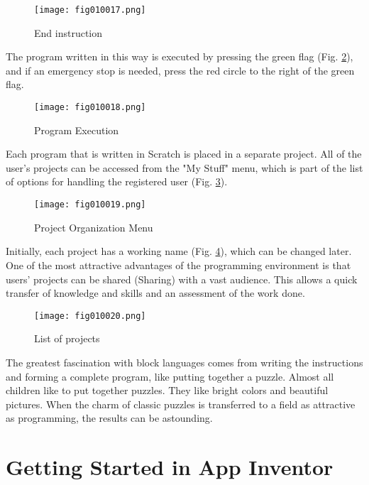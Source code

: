 \begin{figure}[H]
   \centering
   \texttt{[image: fig010017.png]}
   \caption{End instruction}
\label{fig010017}
\end{figure}

The program written in this way is executed by pressing the green flag (Fig. \ref{fig010018}), and if an emergency stop is needed, press the red circle to the right of the green flag.

\begin{figure}[H]
   \centering
   \texttt{[image: fig010018.png]}
   \caption{Program Execution}
\label{fig010018}
\end{figure}

Each program that is written in Scratch is placed in a separate project. All of the user's projects can be accessed from the "My Stuff" menu, which is part of the list of options for handling the registered user (Fig. \ref{fig010019}).

\begin{figure}[H]
   \centering
   \texttt{[image: fig010019.png]}
   \caption{Project Organization Menu}
\label{fig010019}
\end{figure}

Initially, each project has a working name (Fig. \ref{fig010020}), which can be changed later. One of the most attractive advantages of the programming environment is that users' projects can be shared (Sharing) with a vast audience. This allows a quick transfer of knowledge and skills and an assessment of the work done.

\begin{figure}[H]
   \centering
   \texttt{[image: fig010020.png]}
   \caption{List of projects}
\label{fig010020}
\end{figure}

The greatest fascination with block languages comes from writing the instructions and forming a complete program, like putting together a puzzle. Almost all children like to put together puzzles. They like bright colors and beautiful pictures. When the charm of classic puzzles is transferred to a field as attractive as programming, the results can be astounding.

\section{Getting Started in App Inventor}

